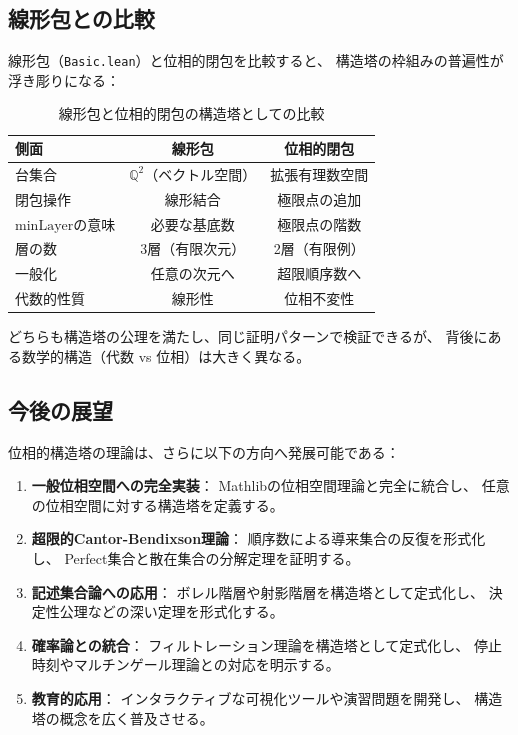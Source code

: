 \documentclass[a4paper,12pt]{ltjsarticle}
\theoremstyle{definition}
\begin{document}
\subsection{線形包との比較}

線形包（\texttt{Basic.lean}）と位相的閉包を比較すると、
構造塔の枠組みの普遍性が浮き彫りになる：

\begin{table}[htbp]
\centering
\begin{tabular}{|l|c|c|}
\hline
\textbf{側面} & \textbf{線形包} & \textbf{位相的閉包} \\
\hline
台集合 & $\mathbb{Q}^2$（ベクトル空間） & 拡張有理数空間 \\
閉包操作 & 線形結合 & 極限点の追加 \\
$\mathrm{minLayer}$の意味 & 必要な基底数 & 極限点の階数 \\
層の数 & 3層（有限次元） & 2層（有限例） \\
一般化 & 任意の次元へ & 超限順序数へ \\
代数的性質 & 線形性 & 位相不変性 \\
\hline
\end{tabular}
\caption{線形包と位相的閉包の構造塔としての比較}
\end{table}

どちらも構造塔の公理を満たし、同じ証明パターンで検証できるが、
背後にある数学的構造（代数 vs 位相）は大きく異なる。

\subsection{今後の展望}

位相的構造塔の理論は、さらに以下の方向へ発展可能である：

\begin{enumerate}
\item \textbf{一般位相空間への完全実装}：
  Mathlibの位相空間理論と完全に統合し、
  任意の位相空間に対する構造塔を定義する。

\item \textbf{超限的Cantor-Bendixson理論}：
  順序数による導来集合の反復を形式化し、
  Perfect集合と散在集合の分解定理を証明する。

\item \textbf{記述集合論への応用}：
  ボレル階層や射影階層を構造塔として定式化し、
  決定性公理などの深い定理を形式化する。

\item \textbf{確率論との統合}：
  フィルトレーション理論を構造塔として定式化し、
  停止時刻やマルチンゲール理論との対応を明示する。

\item \textbf{教育的応用}：
  インタラクティブな可視化ツールや演習問題を開発し、
  構造塔の概念を広く普及させる。
\end{enumerate}
\end{document}
